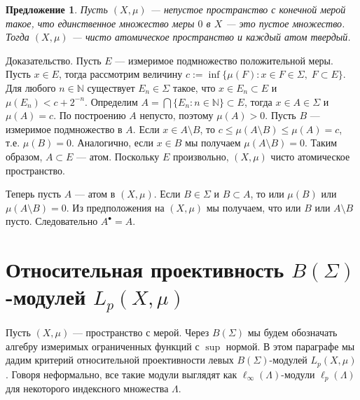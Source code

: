 \documentclass[12pt]{article}
\numberwithin{equation}{subsection}
\theoremstyle{plain}
\newtheorem{proposition}{Предложение}
\newenvironment{proof}{Доказательство.}{}
\begin{document}
\begin{fulltext}
    \begin{proposition}\label{GenniunelyAtomicMeasCharac} Пусть $(X,\mu)$ ---
        непустое пространство с конечной мерой такое, что единственное множество
        меры $0$ в $X$ --- это пустое множество. Тогда $(X,\mu)$ --- чисто
        атомическое пространство и каждый атом твердый.
    \end{proposition}
    \begin{proof} Пусть $E$ --- измеримое подмножество положительной меры. Пусть
        $x\in E$, тогда рассмотрим величину $c:=\inf \{\mu(F):x\in F\in
            \Sigma,\; F\subset E\}$. Для любого $n\in\mathbb{N}$ существует
        $E_n\in\Sigma$ такое, что $x\in E_n\subset E$ и $\mu(E_n)<c+2^{-n}$.
        Определим $A=\bigcap \{E_n:n\in\mathbb{N}\}\subset E$, тогда
        $x\in A\in\Sigma$ и $\mu(A)=c$. По построению $A$ непусто,
        поэтому $\mu(A)>0$. Пусть $B$ --- измеримое подмножество в $A$. Если
        $x\in A\setminus B$, то $c\leq\mu(A\setminus B)\leq\mu(A)=c$, т.е.
        $\mu(B)=0$. Аналогично, если $x\in B$ мы получаем $\mu(A\setminus B)=0$.
        Таким образом, $A\subset E$ --- атом. Поскольку $E$ произвольно,
        $(X,\mu)$ чисто атомическое пространство.

        Теперь пусть $A$ --- атом в $(X,\mu)$. Если $B\in\Sigma$ и $B\subset A$,
        то или $\mu(B)$ или $\mu(A\setminus B)=0$. Из предположения на $(X,\mu)$
        мы получаем, что или $B$ или $A\setminus B$ пусто. Следовательно
        $A^\bullet=A$.
    \end{proof}


    \section{Относительная проективность $B(\Sigma)$-модулей
      $L_p(X,\mu)$}\label{SectionRelativeProjectivityOfBSigmaModulesLpXmu}

    Пусть $(X,\mu)$ --- пространство с мерой. Через $B(\Sigma)$ мы будем
    обозначать алгебру измеримых ограниченных функций с $\sup$ нормой. В этом
    параграфе мы дадим критерий относительной проективности левых
    $B(\Sigma)$-модулей $L_p(X,\mu)$. Говоря неформально, все такие модули
    выглядят как $\ell_\infty(\Lambda)$-модули $\ell_p(\Lambda)$ для некоторого
    индексного множества $\Lambda$.


\end{fulltext}
\end{document}
